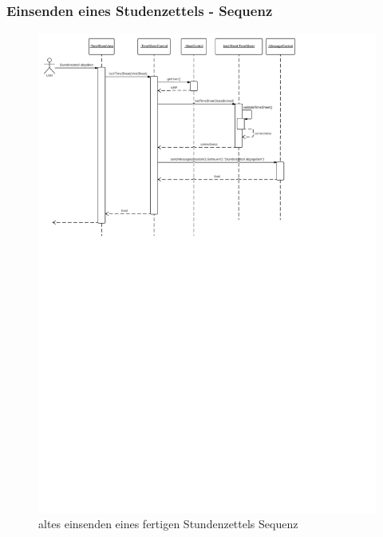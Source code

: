     \newpage
        \subsubsection{Einsenden eines Studenzettels - Sequenz}
                    \begin{figure}[H]
                      \centering
                        \includegraphics[scale=0.1]{send-in-timesheet.pdf}
                       \caption{altes einsenden eines fertigen Stundenzettels  Sequenz}
                    \end{figure}

